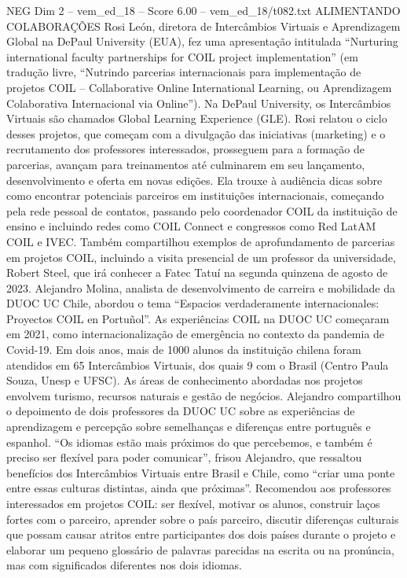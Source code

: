 \begin{textsample}{NEG Dim 2 – vem\_ed\_18 – Score 6.00 – vem\_ed\_18/t082.txt}  \label{ex:f2_neg_108}
ALIMENTANDO COLABORAÇÕES Rosi León, diretora de Intercâmbios Virtuais e Aprendizagem Global na DePaul University (EUA), fez uma apresentação intitulada “Nurturing international faculty partnerships for COIL project implementation” (em tradução livre, “Nutrindo parcerias internacionais para implementação de projetos COIL – Collaborative Online International Learning, ou Aprendizagem Colaborativa Internacional via Online”).
Na DePaul University, os Intercâmbios Virtuais são chamados Global Learning Experience (GLE).
Rosi relatou o ciclo desses projetos, que começam com a divulgação das iniciativas (marketing) e o recrutamento dos professores interessados, prosseguem para a formação de parcerias, avançam para treinamentos até culminarem em seu lançamento, desenvolvimento e oferta em novas edições.
Ela trouxe à audiência dicas sobre como encontrar potenciais parceiros em instituições internacionais, começando pela rede pessoal de contatos, passando pelo coordenador COIL da instituição de ensino e incluindo redes como COIL Connect e congressos como Red LatAM COIL e IVEC.
Também compartilhou exemplos de aprofundamento de parcerias em projetos COIL, incluindo a visita presencial de um professor da universidade, Robert Steel, que irá conhecer a Fatec Tatuí na segunda quinzena de agosto de 2023.
Alejandro Molina, analista de desenvolvimento de carreira e mobilidade da DUOC UC Chile, abordou o tema “Espacios verdaderamente internacionales: Proyectos COIL en Portuñol”.
As experiências COIL na DUOC UC começaram em 2021, como internacionalização de emergência no contexto da pandemia de Covid-19.
Em dois anos, mais de 1000 alunos da instituição chilena foram atendidos em 65 Intercâmbios Virtuais, dos quais 9 com o Brasil (Centro Paula Souza, Unesp e UFSC).
As áreas de conhecimento abordadas nos projetos envolvem turismo, recursos naturais e gestão de negócios.
Alejandro compartilhou o depoimento de dois professores da DUOC UC sobre as experiências de aprendizagem e percepção sobre semelhanças e diferenças entre português e espanhol. “Os idiomas estão mais próximos do que percebemos, e também é preciso ser flexível para poder comunicar”, frisou Alejandro, que ressaltou benefícios dos Intercâmbios Virtuais entre Brasil e Chile, como “criar uma ponte entre essas culturas distintas, ainda que próximas”.
Recomendou aos professores interessados em projetos COIL: ser flexível, motivar os alunos, construir laços fortes com o parceiro, aprender sobre o país parceiro, discutir diferenças culturais que possam causar atritos entre participantes dos dois países durante o projeto e elaborar um pequeno glossário de palavras parecidas na escrita ou na pronúncia, mas com significados diferentes nos dois idiomas.

\end{textsample}
